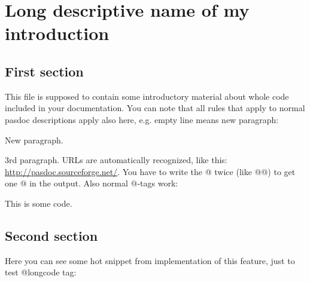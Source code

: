 \documentclass{report}
\begin{document}
\label{toc}\tableofcontents
\newpage
\newlength{\tmplength}
\chapter{Long descriptive name of my introduction}
\label{ok_introduction}
 

 

\label{SecFirst}
\section{First section}


This file is supposed to contain some introductory material about whole code included in your documentation. You can note that all rules that apply to normal pasdoc descriptions apply also here, e.g. empty line means new paragraph:

New paragraph.

3rd paragraph. URLs are automatically recognized, like this: \href{http://pasdoc.sourceforge.net/}{http://pasdoc.sourceforge.net/}. You have to write the @ twice (like @@) to get one @ in the output. Also normal @{-}tags work: \begin{ttfamily}This is some code.\end{ttfamily}

\label{SecSecond}
\section{Second section}


Here you can see some hot snippet from implementation of this feature, just to test @longcode tag:
\end{document}

